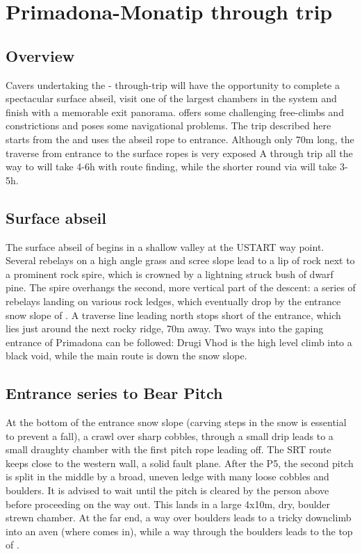 \section{Primadona-Monatip through trip}

\subsection{Overview}
Cavers undertaking the - through-trip will have the opportunity to complete a spectacular surface abseil, visit one of the largest chambers in the system and finish with a memorable exit panorama.  offers some challenging free-climbs and constrictions and poses some navigational problems. The trip described here starts from the  and uses the abseil rope to  entrance. Although only 70m long, the traverse from  entrance to the surface ropes is very exposed A through trip all the way to  will take 4-6h with route finding, while the shorter round via  will take 3-5h. 

\subsection{Surface abseil}
The surface abseil of  begins in a shallow valley at the USTART way point. Several rebelays on a high angle grass and scree slope lead to a lip of rock next to a prominent rock spire, which is crowned by a lightning struck bush of dwarf pine. The spire overhangs the second, more vertical part of the descent: a series of rebelays landing on various rock ledges, which eventually drop by the entrance snow slope of . A traverse line leading north stops short of the  entrance, which lies just around the next rocky ridge, 70m away. Two ways into the gaping entrance of Primadona can be followed: Drugi Vhod is the high level climb into a black void, while the main route is down the snow slope.

\subsection{Entrance series to Bear Pitch}
At the bottom of the entrance snow slope (carving steps in the snow is essential to prevent a fall), a crawl over sharp cobbles, through a small drip leads to a small draughty chamber with the first pitch rope leading off. The SRT route keeps close to the western wall, a solid fault plane. After the P5, the second pitch is split in the middle by a broad, uneven ledge with many loose cobbles and boulders. It is advised to wait until the pitch is cleared by the person above before proceeding on the way out. This lands in a large 4x10m, dry, boulder strewn chamber. At the far end, a way over boulders leads to a tricky downclimb into an aven (where  comes in), while a way through the boulders leads to the top of .

